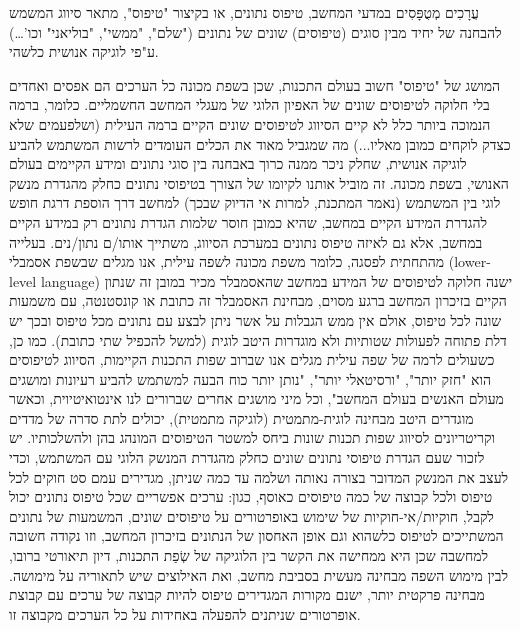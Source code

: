       עֲרָכִים מְטֻפָּסִים
      במדעי המחשב, טיפוס נתונים, או בקיצור "טיפוס", מתאר סיווג המשמש להבחנה של יחיד מבין סוגים (טיפוסים) שונים של נתונים ("שלם", "ממשי", "בוליאני" וכו'…) ע"פי לוגיקה אנושית כלשהי.

      המושג של "טיפוס" חשוב בעולם התכנות, שכן בשפת מכונה כל הערכים הם אפסים ואחדים
      בלי חלוקה לטיפוסים שונים של האפיון הלוגי של מעגלי המחשב החשמליים. כלומר, ברמה
      הנמוכה ביותר כלל לא קיים הסיווג לטיפוסים שונים הקיים ברמה העילית (ושלפעמים שלא
      כצדק לוקחים כמובן מאליו...) מה שמגביל מאוד את הכלים העומדים לרשות המשתמש להביע
      לוגיקה אנושית, שחלק ניכר ממנה כרוך באבחנה בין סוגי נתונים ומידע הקיימים בעולם
      האנושי, בשפת מכונה. זה מוביל אותנו לקיומו של הצורך בטיפוסי נתונים כחלק מהגדרת
      מנשק לוגי בין המשתמש (נאמר המתכנת, למרות אי הדיוק שבכך) למחשב דרך הוספת דרגת
      חופש להגדרת המידע הקיים במחשב, שהיא כמובן חוסר שלמות הגדרת נתונים רק במידע
      הקיים במחשב, אלא גם לאיזה טיפוס נתונים במערכת הסיווג, משתייך אותו/ם נתון/נים.
      בעלייה מהתחתית לפסגה, כלומר משפת מכונה לשפה עילית, אנו מגלים שבשפת אסמבלי
      (lower-level language) ישנה חלוקה לטיפוסים של המידע במחשב שהאסמבלר מכיר במובן
      זה שנתון הקיים בזיכרון המחשב ברגע מסוים, מבחינת האסמבלר זה כתובת או קונסטנטה,
      עם משמעות שונה לכל טיפוס, אולם אין ממש הגבלות על אשר ניתן לבצע עם נתונים מכל
      טיפוס ובכך יש דלת פתוחה לפעולות שטותיות ולא מוגדרות היטב לוגית (למשל להכפיל שתי
      כתובת). כמו כן, כשעולים לרמה של שפה עילית מגלים אנו שברוב שפות התכנות הקיימות,
      הסיווג לטיפוסים הוא "חזק יותר", "ורסיטאלי יותר", "נותן יותר כוח הבעה למשתמש
      להביע רעיונות ומושגים מעולם האנשים בעולם המחשב", וכל מיני מושגים אחרים שברורים
      לנו אינטואיטיוית, וכאשר מוגדרים היטב מבחינה לוגית-מתמטית (לוגיקה מתמטית),
      יכולים לתת סדרה של מדדים וקריטריונים לסיווג שפות תכנות שונות ביחס למשטר
      הטיפוסים המונהג בהן ולהשלכותיו. יש לזכור שעם הגדרת טיפוסי נתונים שונים כחלק
      מהגדרת המנשק הלוגי עם המשתמש, וכדי לעצב את המנשק המדובר בצורה נאותה ושלמה עד
      כמה שניתן, מגדירים עמם סט חוקים לכל טיפוס ולכל קבוצה של כמה טיפוסים כאוסף,
      כגון: ערכים אפשריים שכל טיפוס נתונים יכול לקבל, חוקיות/אי-חוקיות של שימוש
      באופרטורים על טיפוסים שונים, המשמעות של נתונים המשתייכים לטיפוס כלשהוא וגם אופן
      האחסון של הנתונים בזיכרון המחשב, וזו נקודה חשובה למחשבה שכן היא ממחישה את הקשר
      בין הלוגיקה של שְׂפַת התכנות, דיון תיאורטי ברובו, לבין מימוש השפה מבחינה מעשית
      בסביבת מחשב, ואת האילוצים שיש לתאוריה על מימושה. מבחינה פרקטית יותר, ישנם
      מקורות המגדירים טיפוס להיות קבוצה של ערכים עם קבוצת אופרטורים שניתנים להפעלה
      באחידות על כל הערכים מקבוצה זו.

